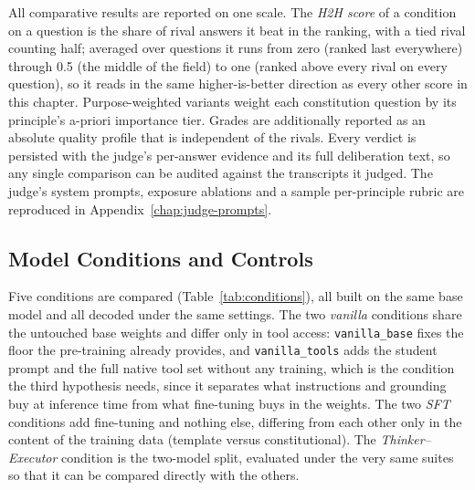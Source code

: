 All comparative results are reported on one scale. The \emph{H2H score} of a condition on a question is the share of rival answers it beat in the ranking, with a tied rival counting half; averaged over questions it runs from zero (ranked last everywhere) through 0.5 (the middle of the field) to one (ranked above every rival on every question), so it reads in the same higher-is-better direction as every other score in this chapter. Purpose-weighted variants weight each constitution question by its principle's a-priori importance tier. Grades are additionally reported as an absolute quality profile that is independent of the rivals. Every verdict is persisted with the judge's per-answer evidence and its full deliberation text, so any single comparison can be audited against the transcripts it judged. The judge's system prompts, exposure ablations and a sample per-principle rubric are reproduced in Appendix~\ref{chap:judge-prompts}.

\subsection{Model Conditions and Controls}
\label{subsec:mr-conditions}

Five conditions are compared (Table~\ref{tab:conditions}), all built on the same base model \cite{yang2025qwen3technicalreport} and all decoded under the same settings. The two \emph{vanilla} conditions share the untouched base weights and differ only in tool access: \texttt{vanilla\_base} fixes the floor the pre-training already provides, and \texttt{vanilla\_tools} adds the student prompt and the full native tool set without any training, which is the condition the third hypothesis needs, since it separates what instructions and grounding buy at inference time from what fine-tuning buys in the weights. The two \emph{SFT} conditions add fine-tuning and nothing else, differing from each other only in the content of the training data (template versus constitutional). The \emph{Thinker--Executor} condition is the two-model split, evaluated under the very same suites so that it can be compared directly with the others.

